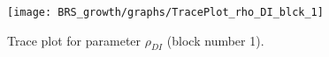 \begin{figure}[H]
\centering
  \texttt{[image: BRS\_growth/graphs/TracePlot\_rho\_DI\_blck\_1]}\\
    \caption{Trace plot for parameter ${\rho_{DI}}$ (block number 1).}
\end{figure}
